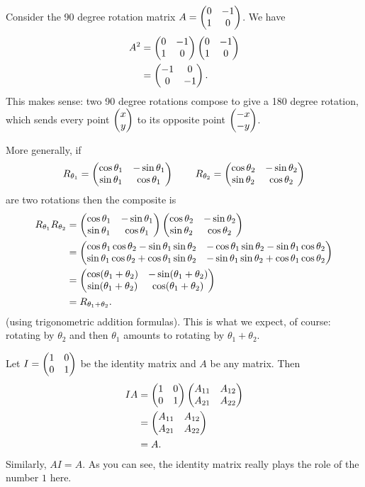 \documentclass{article}
\begin{document}
\begin{Example}
Consider the 90 degree rotation matrix \(A=\begin{pmatrix} 0 & -1 \\ 1 & 0
\end{pmatrix}\). We have
\begin{align*}
A^2&=\begin{pmatrix} 0 & -1 \\ 1 & 0 \end{pmatrix}\begin{pmatrix} 0 & -1 \\ 1 & 0 \end{pmatrix}\\
&=\begin{pmatrix} -1 & 0 \\ 0 & -1 \end{pmatrix}.
\end{align*}
This makes sense: two 90 degree rotations compose to give a 180
degree rotation, which sends every point \(\begin{pmatrix} x \\ y\end{pmatrix}\) to its
opposite point \(\begin{pmatrix} -x \\ -y\end{pmatrix}\).


\end{Example}
\begin{Example}
More generally, if \[R_{\theta_1}=\begin{pmatrix} \cos\theta_1 & -\sin\theta_1
\\ \sin\theta_1 & \cos\theta_1\end{pmatrix}\,\qquad R_{\theta_2}=\begin{pmatrix}
\cos\theta_2 & -\sin\theta_2 \\ \sin\theta_2 & \cos\theta_2\end{pmatrix}\] are
two rotations then the composite is
\begin{align*}
R_{\theta_1}R_{\theta_2}&=\begin{pmatrix} \cos\theta_1 & -\sin\theta_1 \\ \sin\theta_1 & \cos\theta_1\end{pmatrix}\begin{pmatrix} \cos\theta_2 & -\sin\theta_2 \\ \sin\theta_2 & \cos\theta_2\end{pmatrix}\\
&=\begin{pmatrix} \cos\theta_1\cos\theta_2-\sin\theta_1\sin\theta_2 & -\cos\theta_1\sin\theta_2-\sin\theta_1\cos\theta_2\\ \sin\theta_1\cos\theta_2+\cos\theta_1\sin\theta_2 & -\sin\theta_1\sin\theta_2+\cos\theta_1\cos\theta_2\end{pmatrix}\\
&=\begin{pmatrix} \cos(\theta_1+\theta_2) & -\sin(\theta_1+\theta_2) \\ \sin(\theta_1+\theta_2) & \cos(\theta_1+\theta_2)\end{pmatrix}\\
&=R_{\theta_1+\theta_2}.
\end{align*}
(using trigonometric addition formulas). This is what we expect, of
course: rotating by \(\theta_2\) and then \(\theta_1\) amounts to
rotating by \(\theta_1+\theta_2\).


\end{Example}
\begin{Example}
Let \(I=\begin{pmatrix} 1 & 0 \\ 0 & 1\end{pmatrix}\) be the identity matrix and \(A\) be
any matrix. Then
\begin{align*}
IA&=\begin{pmatrix} 1 & 0 \\ 0 & 1\end{pmatrix}\begin{pmatrix} A_{11} & A_{12} \\ A_{21} & A_{22}\end{pmatrix}\\
&=\begin{pmatrix} A_{11} & A_{12} \\ A_{21} & A_{22}\end{pmatrix}\\
&=A.
\end{align*}
Similarly, \(AI=A\). As you can see, the identity matrix really
plays the role of the number \(1\) here.


\end{Example}
\end{document}

